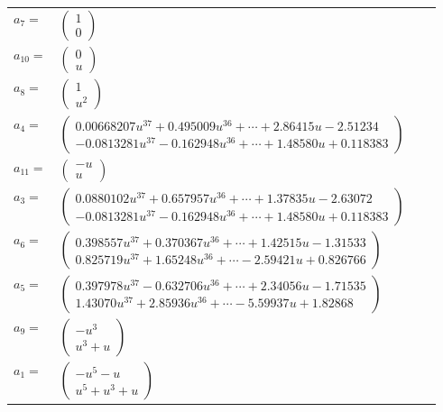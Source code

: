 \documentclass[1p]{elsarticle_modified}
\theoremstyle{definition}
\begin{document}
\begin{tabular}{m{7pt} m{180pt} m{7pt} m{180pt} }
\flushright $a_{7}=$&$\begin{pmatrix}1\\0\end{pmatrix}$ \\
\flushright $a_{10}=$&$\begin{pmatrix}0\\u\end{pmatrix}$ \\
\flushright $a_{8}=$&$\begin{pmatrix}1\\u^2\end{pmatrix}$ \\
\flushright $a_{4}=$&$\begin{pmatrix}0.00668207 u^{37}+0.495009 u^{36}+\cdots+2.86415 u-2.51234\\-0.0813281 u^{37}-0.162948 u^{36}+\cdots+1.48580 u+0.118383\end{pmatrix}$ \\
\flushright $a_{11}=$&$\begin{pmatrix}- u\\u\end{pmatrix}$ \\
\flushright $a_{3}=$&$\begin{pmatrix}0.0880102 u^{37}+0.657957 u^{36}+\cdots+1.37835 u-2.63072\\-0.0813281 u^{37}-0.162948 u^{36}+\cdots+1.48580 u+0.118383\end{pmatrix}$ \\
\flushright $a_{6}=$&$\begin{pmatrix}0.398557 u^{37}+0.370367 u^{36}+\cdots+1.42515 u-1.31533\\0.825719 u^{37}+1.65248 u^{36}+\cdots-2.59421 u+0.826766\end{pmatrix}$ \\
\flushright $a_{5}=$&$\begin{pmatrix}0.397978 u^{37}-0.632706 u^{36}+\cdots+2.34056 u-1.71535\\1.43070 u^{37}+2.85936 u^{36}+\cdots-5.59937 u+1.82868\end{pmatrix}$ \\
\flushright $a_{9}=$&$\begin{pmatrix}- u^3\\u^3+u\end{pmatrix}$ \\
\flushright $a_{1}=$&$\begin{pmatrix}- u^5- u\\u^5+u^3+u\end{pmatrix}$ \\

\end{tabular}
\end{document}
